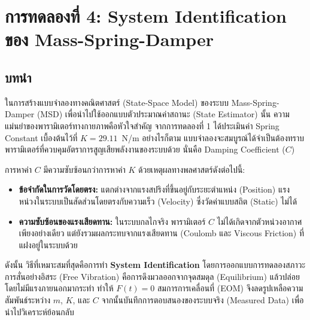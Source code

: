 
\section{การทดลองที่ 4: System Identification ของ Mass-Spring-Damper}

\subsection{บทนำ}

ในการสร้างแบบจำลองทางคณิตศาสตร์ (State-Space Model) ของระบบ Mass-Spring-Damper (MSD) เพื่อนำไปใช้ออกแบบตัวประมาณค่าสถานะ (State Estimator) นั้น ความแม่นยำของพารามิเตอร์ทางกายภาพคือหัวใจสำคัญ จากการทดลองที่ 1 ได้ประเมินค่า Spring Constant เบื้องต้นไว้ที่ $K = 29.11$~N/m อย่างไรก็ตาม แบบจำลองจะสมบูรณ์ได้จำเป็นต้องทราบพารามิเตอร์ที่ควบคุมอัตราการสูญเสียพลังงานของระบบด้วย นั่นคือ Damping Coefficient ($C$) 

การหาค่า $C$ มีความซับซ้อนกว่าการหาค่า $K$ ด้วยเหตุผลทางพลศาสตร์ดังต่อไปนี้:
\begin{itemize}
    \item \textbf{ข้อจำกัดในการวัดโดยตรง:} แตกต่างจากแรงสปริงที่ขึ้นอยู่กับระยะตำแหน่ง (Position) แรงหน่วงในระบบเป็นสัดส่วนโดยตรงกับความเร็ว (Velocity) ซึ่งวัดค่าแบบสถิต (Static) ไม่ได้
    \item \textbf{ความซับซ้อนของแรงเสียดทาน:} ในระบบกลไกจริง พารามิเตอร์ $C$ ไม่ได้เกิดจากตัวหน่วงอากาศเพียงอย่างเดียว แต่ยังรวมผลกระทบจากแรงเสียดทาน (Coulomb และ Viscous Friction) ที่แฝงอยู่ในระบบด้วย
\end{itemize}



ดังนั้น วิธีที่เหมาะสมที่สุดคือการทำ \textbf{System Identification} โดยการออกแบบการทดลองสภาวะการสั่นอย่างอิสระ (Free Vibration) คือการดึงมวลออกจากจุดสมดุล (Equilibrium) แล้วปล่อยโดยไม่มีแรงภายนอกมากระทำ ทำให้ $F(t) = 0$ สมการการเคลื่อนที่ (EOM) จึงลดรูปเหลือความสัมพันธ์ระหว่าง $m$, $K$, และ $C$ จากนั้นบันทึกการตอบสนองของระบบจริง (Measured Data) เพื่อนำไปวิเคราะห์ย้อนกลับ

